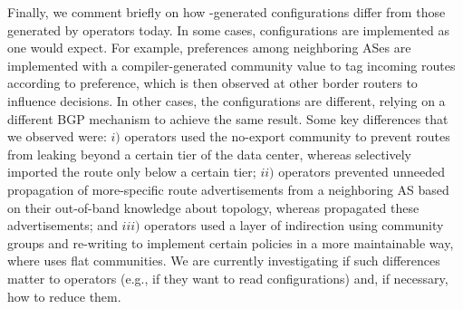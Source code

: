 Finally, we comment briefly on how \sysname-generated configurations differ from those generated by operators today. 
%
In some cases, \sysname configurations are implemented as one would expect. For example, preferences among neighboring ASes are implemented with a compiler-generated community value to tag incoming routes according to preference, which is then observed at other border routers to influence decisions. In other cases, the \sysname configurations are different, relying on a different BGP mechanism to achieve the same result. Some key differences that we observed were: 
%
$i)$ operators used the no-export community to prevent routes from leaking beyond a certain tier of the data center, whereas \sysname selectively imported the route only below a certain tier; 
%
$ii)$ operators prevented unneeded propagation of more-specific route advertisements from a neighboring AS based on their out-of-band knowledge about topology, whereas \sysname propagated these advertisements; and
%
$iii)$ operators used a layer of indirection using community groups and re-writing to implement certain policies in a more maintainable way, where \sysname uses flat communities. We are currently investigating if such differences matter to operators (e.g., if they want to read \sysname configurations) and, if necessary, how to reduce them.


